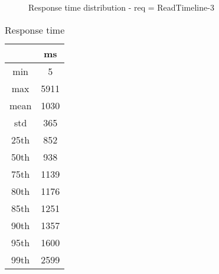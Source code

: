 \begin{minipage}{0.75\linewidth}
\begin{figure}[h]
\begin{adjustbox}{max width=1.0\linewidth, keepaspectratio}
  \end{adjustbox}
  \caption{Response time distribution - req = ReadTimeline-3}
\end{figure}
\end{minipage}\hfill\begin{minipage}{0.18\linewidth}
\begin{table}[h]
\begin{tabular}{|cc|}
\hline
\textbf{} & \textbf{ms}\\ \hline
 \Xhline{0.005\arrayrulewidth}
min & 5\\
 \Xhline{0.005\arrayrulewidth}
max & 5911\\
 \Xhline{0.005\arrayrulewidth}
mean & 1030\\
 \Xhline{0.005\arrayrulewidth}
std & 365\\
\hline
\hline
 \Xhline{0.005\arrayrulewidth}
25th & 852\\
 \Xhline{0.005\arrayrulewidth}
50th & 938\\
 \Xhline{0.005\arrayrulewidth}
75th & 1139\\
 \Xhline{0.005\arrayrulewidth}
80th & 1176\\
 \Xhline{0.005\arrayrulewidth}
85th & 1251\\
 \Xhline{0.005\arrayrulewidth}
90th & 1357\\
 \Xhline{0.005\arrayrulewidth}
95th & 1600\\
 \Xhline{0.005\arrayrulewidth}
99th & 2599\\
\hline
\end{tabular}
\caption{Response time}
\end{table}
\end{minipage}\hfill